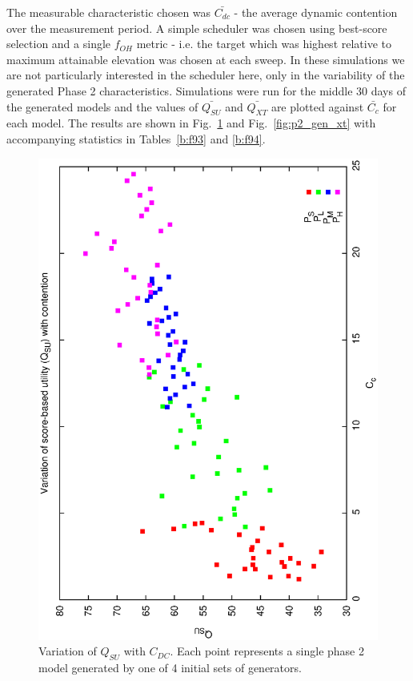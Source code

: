 The measurable characteristic chosen was $\bar{C_{dc}}$ - the average dynamic contention over the measurement period. A simple scheduler was chosen using best-score selection and a single $f_{OH}$ metric - i.e. the target which was highest relative to maximum attainable elevation was chosen at each sweep. In these simulations we are not particularly interested in the scheduler here, only in the variability of the generated  Phase 2 characteristics. Simulations were run for the middle 30 days of the generated models and the values of $\bar{Q_{SU}}$ and $\bar{Q_{XT}}$ are plotted against $\bar{C_c}$ for each model. The results are shown in Fig.~\ref{fig:p2_gen_su} and  Fig.~\ref{fig:p2_gen_xt} with accompanying statistics in Tables~\ref{b:f93} and \ref{b:f94}.



\begin{figure}[h]
\begin{center}
 \includegraphics[scale=0.5, angle=-90]{figures/p2_gen_qsu.eps}
 \caption[Variation of $Q_{SU}$ with $C_{DC}$ for variable phase2 generator models.] 
   {Variation of $Q_{SU}$ with $C_{DC}$. Each point represents a single phase 2 model generated by one of 4 initial sets of generators.}
\label{fig:p2_gen_su}
\end{center}
\end{figure}


